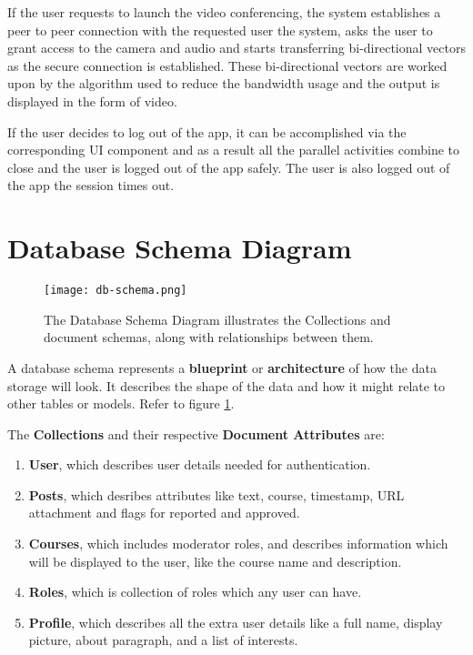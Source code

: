 If the user requests to launch the video conferencing, the system establishes a peer to peer connection with the requested user 
the system, asks the user to grant access to the camera and audio and starts transferring bi-directional vectors as the secure connection is established.
These bi-directional vectors are worked upon by the algorithm used to reduce the bandwidth usage and the output is displayed in the form of video.

If the user decides to log out of the app, it can be accomplished via the corresponding UI component and as a result all the 
parallel activities combine to close and the user is logged out of the app safely.
The user is also logged out of the app the session times out.

\section{Database Schema Diagram}

\begin{figure}[h!]
    \centering
    \texttt{[image: db-schema.png]}
    \caption{The Database Schema Diagram illustrates the Collections and document schemas, 
    along with relationships between them.}
    \label{fig:schema}
\end{figure}

A database schema represents a \textbf{blueprint} or \textbf{architecture} of how the data storage will look. 
It describes the shape of the data and how it might relate to other tables or models. Refer to figure \ref{fig:schema}.

The \textbf{Collections} and their respective \textbf{Document Attributes} are:
\begin{enumerate}
    \item \textbf{User}, which describes user details needed for authentication.
    \item \textbf{Posts}, which desribes attributes like text, course, timestamp, URL attachment 
    and flags for reported and approved.
    \item \textbf{Courses}, which includes moderator roles, and describes information which will 
    be displayed to the user, like the course name and description.
    \item \textbf{Roles}, which is collection of roles which any user can have.
    \item \textbf{Profile}, which describes all the extra user details like a full name, display picture, about paragraph, and a list of interests.
\end{enumerate}


